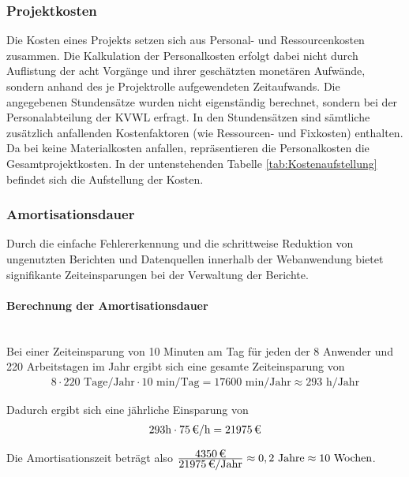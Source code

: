 \subsubsection{Projektkosten}
\label{sec:Projektkosten}
Die Kosten eines Projekts setzen sich aus Personal- und Ressourcenkosten zusammen. Die Kalkulation der Personalkosten erfolgt dabei nicht durch Auflistung der acht Vorgänge und ihrer geschätzten monetären Aufwände, sondern anhand des je Projektrolle aufgewendeten Zeitaufwands. Die angegebenen Stundensätze wurden nicht eigenständig berechnet, sondern bei der Personalabteilung der \ac{KVWL} erfragt. In den Stundensätzen sind sämtliche zusätzlich anfallenden Kostenfaktoren (wie Ressourcen- und Fixkosten) enthalten. Da bei \projektName keine Materialkosten anfallen, repräsentieren die Personalkosten die Gesamtprojektkosten. In der untenstehenden Tabelle \ref{tab:Kostenaufstellung} befindet sich die Aufstellung der Kosten.

\subsubsection{Amortisationsdauer}
\label{sec:Amortisationsdauer}
Durch die einfache Fehlererkennung und die schrittweise Reduktion von ungenutzten Berichten und Datenquellen innerhalb der Webanwendung bietet \projektName signifikante Zeiteinsparungen bei der Verwaltung der Berichte.

\paragraph{Berechnung der Amortisationsdauer} ~\\
Bei einer Zeiteinsparung von 10 Minuten am Tag für jeden der 8 Anwender und 220 Arbeitstagen im Jahr ergibt sich eine gesamte Zeiteinsparung von 
\begin{eqnarray}
8 \cdot 220 \mbox{ Tage/Jahr} \cdot 10 \mbox{ min/Tag} = 17600 \mbox{ min/Jahr} \approx 293 \mbox{ h/Jahr} 
\end{eqnarray}

Dadurch ergibt sich eine jährliche Einsparung von 
\begin{eqnarray}
293 \mbox{h} \cdot \eur{75}{\mbox{/h}} = \eur{21975}
\end{eqnarray}

Die Amortisationszeit beträgt also $\frac{\eur{4350}}{\eur{21975}\mbox{/Jahr}} \approx 0,2 \mbox{ Jahre} \approx 10 \mbox{ Wochen}$.

